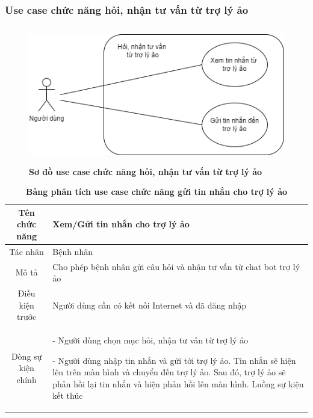 \subsubsection{Use case chức năng hỏi, nhận tư vấn từ trợ lý ảo}
  \begin{figure}[H]
    \centering
    \includegraphics[width=12cm,height=6cm]{Images/use_case/use_case_chatbot.png}
    \caption[Sơ đồ use case chức năng hỏi, nhận tư vấn từ trợ lý ảo]{\bfseries \fontsize{12pt}{0pt}
    \selectfont Sơ đồ use case chức năng hỏi, nhận tư vấn từ trợ lý ảo}
    \label{use_case_chat_ai} %
  \end{figure}
  \begin{table}[H]
    \caption{\bfseries \fontsize{12pt}{0pt}\selectfont Bảng phân tích use case chức năng gửi tin nhắn cho trợ lý ảo}
    \centering
    \begin{tabularx}{0.9\textwidth}{|c|X|}
      \hline
      \textbf{Tên chức năng} & \textbf{Xem/Gửi tin nhắn cho trợ lý ảo} \\
      \hline
      Tác nhân & Bệnh nhân \\
      \hline
      Mô tả & Cho phép bệnh nhân gửi câu hỏi và nhận tư vấn từ chat bot trợ lý ảo \\
      \hline
      Điều kiện trước & Người dùng cần có kết nối Internet và đã đăng nhập \\
      \hline
      Dòng sự kiện chính & 
        - Người dùng chọn mục hỏi, nhận tư vấn từ trợ lý ảo
        
        - Người dùng nhập tin nhắn và gửi tới trợ lý ảo. Tin nhắn sẽ hiện lên trên màn hình và chuyển đến trợ lý ảo. 
        Sau đó, trợ lý ảo sẽ phản hồi lại tin nhắn và hiện phản hồi lên màn hình. Luồng sự kiện kết thúc
        \\
      \hline
    \end{tabularx}
  \end{table}  

